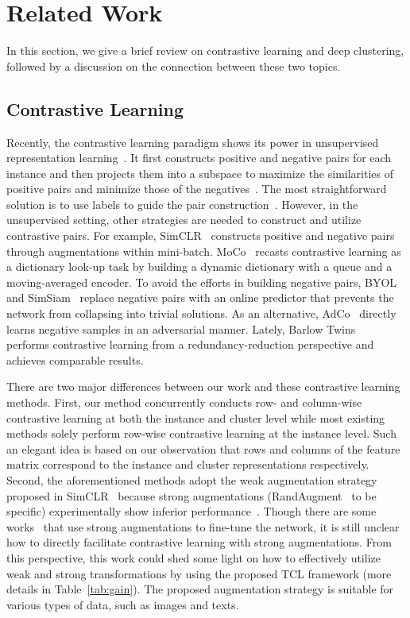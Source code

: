\section{Related Work}

In this section, we give a brief review on contrastive learning and deep clustering, followed by a discussion on the connection between these two topics.

\subsection{Contrastive Learning}

Recently, the contrastive learning paradigm shows its power in unsupervised representation learning~\citep{MOCO, SimCLR, BYOL, SimSiam, AdCo, SWAV, BarlowTwins}. It first constructs positive and negative pairs for each instance and then projects them into a subspace to maximize the similarities of positive pairs and minimize those of the negatives~\citep{DimensionalityReductionbyLearninganInvariantMapping}. The most straightforward solution is to use labels to guide the pair construction~\citep{SupervisedCL}. However, in the unsupervised setting, other strategies are needed to construct and utilize contrastive pairs. For example, SimCLR~\citep{SimCLR} constructs positive and negative pairs through augmentations within mini-batch. MoCo~\citep{MOCO} recasts contrastive learning as a dictionary look-up task by building a dynamic dictionary with a queue and a moving-averaged encoder. To avoid the efforts in building negative pairs, BYOL~\citep{BYOL} and SimSiam~\citep{SimSiam} replace negative pairs with an online predictor that prevents the network from collapsing into trivial solutions. As an alternative, AdCo~\citep{AdCo} directly learns negative samples in an adversarial manner. Lately, Barlow Twins~\citep{BarlowTwins} performs contrastive learning from a redundancy-reduction perspective and achieves comparable results.

There are two major differences between our work and these contrastive learning methods. First, our method concurrently conducts row- and column-wise contrastive learning at both the instance and cluster level while most existing methods solely perform row-wise contrastive learning at the instance level. Such an elegant idea is based on our observation that rows and columns of the feature matrix correspond to the instance and cluster representations respectively. Second, the aforementioned methods adopt the weak augmentation strategy proposed in SimCLR~\citep{SimCLR} because strong augmentations (RandAugment~\citep{RandAug} to be specific) experimentally show inferior performance~\citep{StrongContrastive}. Though there are some works~\citep{SCAN} that use strong augmentations to fine-tune the network, it is still unclear how to directly facilitate contrastive learning with strong augmentations. From this perspective, this work could shed some light on how to effectively utilize weak and strong transformations by using the proposed TCL framework (more details in Table~\ref{tab:gain}). The proposed augmentation strategy is suitable for various types of data, such as images and texts.

